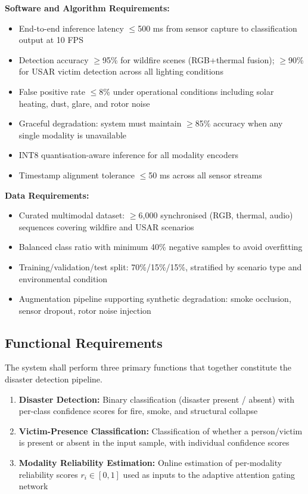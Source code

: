\textbf{Software and Algorithm Requirements:}
\begin{itemize}
    \item End-to-end inference latency $\leq$500 ms from sensor capture to classification output at 10 FPS
    \item Detection accuracy $\geq$95\% for wildfire scenes (RGB+thermal fusion); $\geq$90\% for USAR victim detection across all lighting conditions
    \item False positive rate $\leq$8\% under operational conditions including solar heating, dust, glare, and rotor noise
    \item Graceful degradation: system must maintain $\geq$85\% accuracy when any single modality is unavailable
    \item INT8 quantisation-aware inference for all modality encoders
    \item Timestamp alignment tolerance $\leq$50 ms across all sensor streams
\end{itemize}

\textbf{Data Requirements:}
\begin{itemize}
    \item Curated multimodal dataset: $\geq$6,000 synchronised (RGB, thermal, audio) sequences covering wildfire and USAR scenarios
    \item Balanced class ratio with minimum 40\% negative samples to avoid overfitting
    \item Training/validation/test split: 70\%/15\%/15\%, stratified by scenario type and environmental condition
    \item Augmentation pipeline supporting synthetic degradation: smoke occlusion, sensor dropout, rotor noise injection
\end{itemize}

\subsection{Functional Requirements}

The system shall perform three primary functions that together constitute the disaster detection pipeline.

\begin{enumerate}
    \item \textbf{Disaster Detection:} Binary classification (disaster present / absent) with per-class confidence scores for fire, smoke, and structural collapse
    \item \textbf{Victim-Presence Classification:} Classification of whether a person/victim is present or absent in the input sample, with individual confidence scores
    \item \textbf{Modality Reliability Estimation:} Online estimation of per-modality reliability scores $r_i \in [0,1]$ used as inputs to the adaptive attention gating network
\end{enumerate}

